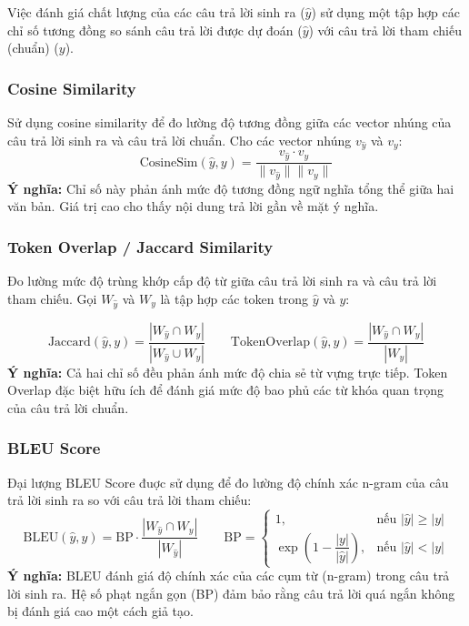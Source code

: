 Việc đánh giá chất lượng của các câu trả lời sinh ra ($\hat{y}$) sử dụng một tập hợp các chỉ số tương đồng so sánh câu trả lời được dự đoán ($\hat{y}$) với câu trả lời tham chiếu (chuẩn) ($y$).

\subsubsection{Cosine Similarity}

Sử dụng cosine similarity \cite{manning2008introduction} để đo lường độ tương đồng giữa các vector nhúng của câu trả lời sinh ra và câu trả lời chuẩn. Cho các vector nhúng $v_{\hat{y}}$ và $v_y$:
\[
  \text{CosineSim}(\hat{y}, y) = \frac{v_{\hat{y}} \cdot v_y}{\|v_{\hat{y}}\|\|v_y\|}
\]
\textbf{Ý nghĩa:} Chỉ số này phản ánh mức độ tương đồng ngữ nghĩa tổng thể giữa hai văn bản. Giá trị
cao cho thấy nội dung trả lời gần về mặt ý nghĩa.


\subsubsection{Token Overlap / Jaccard Similarity}

Đo lường mức độ trùng khớp cấp độ từ giữa câu trả lời sinh ra và câu trả lời tham chiếu. Gọi $W_{\hat{y}}$ và $W_y$ là tập hợp các token trong $\hat{y}$ và $y$:

\[
  \text{Jaccard}(\hat{y}, y) = \frac{|W_{\hat{y}} \cap W_y|}{|W_{\hat{y}} \cup W_y|}
  \qquad
  \text{TokenOverlap}(\hat{y}, y) = \frac{|W_{\hat{y}} \cap W_y|}{|W_y|}
\]
\textbf{Ý nghĩa:} Cả hai chỉ số đều phản ánh mức độ chia sẻ từ vựng trực tiếp. Token Overlap đặc biệt
hữu ích để đánh giá mức độ bao phủ các từ khóa quan trọng của câu trả lời chuẩn.
\subsubsection{BLEU Score}

Đại lượng BLEU Score\cite{papineni2002bleu} đuợc sử dụng để đo lường độ chính xác n-gram của câu trả lời sinh ra so với câu trả lời tham chiếu:
\[
  \text{BLEU}(\hat{y}, y) = \text{BP} \cdot \frac{|W_{\hat{y}} \cap W_y|}{|W_{\hat{y}}|}
  \qquad
  \text{BP} =
  \begin{cases}
    1, & \text{nếu } |\hat{y}| \geq |y| \\
    \exp\!\left(1 - \dfrac{|y|}{|\hat{y}|}\right), & \text{nếu } |\hat{y}| < |y|
  \end{cases}
\]
\textbf{Ý nghĩa:} BLEU đánh giá độ chính xác của các cụm từ (n-gram) trong câu trả lời sinh ra. Hệ số
phạt ngắn gọn (BP) đảm bảo rằng câu trả lời quá ngắn không bị đánh giá cao một cách giả tạo.
